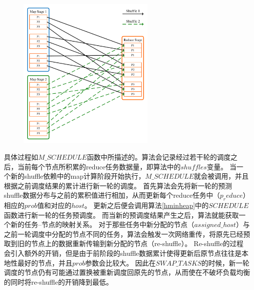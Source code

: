 \begin{figure}[!htp]
    \centering
    \includegraphics[width=0.6\textwidth]{../figure/twoshuffles.pdf}
\end{figure}

具体过程如$M\_SCHEDULE$函数中所描述的。算法会记录经过若干轮的调度之后，当前每个节点所积累的reduce任务数据量，即算法中的$shuffles$变量。
当一个新的shuffle依赖中的map计算阶段开始执行，$M\_SCHEDULE$就会被调用，并且根据之前调度结果的累计进行新一轮的调度。
首先算法会先将新一轮的预测shuffle数据分布与之前的累积值进行相加，从而更新每个reduce任务中（$p_reduce$）相应的$prob$值和对应的$host$。
更新之后便会调用算法\ref{hminheap}中的$SCHEDULE$函数进行新一轮的任务预调度。
而当新的预调度结果产生之后，算法就能获取一个新的任务--节点的映射关系。
对于那些任务中新分配的节点（$assigned\_host$）与之前一轮调度中分配的节点不同的任务，算法会触发一次网络重传，将原先已经预取到旧的节点上的数据重新传输到新分配的节点（re-shuffle）。
Re-shuffle的过程会引入额外的开销，但是由于前阶段的shuffle数据累计使得更新后原节点往往是本地性最好的节点，并且$prob$参数会比较大。
因此在$SWAP\_TASKS$的时候，新一轮调度的节点仍有可能通过置换被重新调度回原先的节点，从而使在不破坏负载均衡的同时将re-shuffle的开销降到最低。


